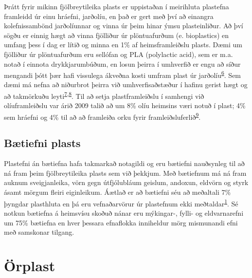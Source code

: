 \documentclass[icelandic,]{book}
\begin{document}
Þrátt fyrir mikinn fjölbreytileika plasts er uppistaðan í meirihluta plastefna framleidd úr einu hráefni, jarðolíu, en það er gert með því að einangra kolefnissambönd jarðolíunnar og vinna úr þeim hinar ýmsu plasteinliður. Að því sögðu er einnig hægt að vinna fjölliður úr plöntuafurðum (e. bioplastics) en umfang þess í dag er lítið og minna en 1\% af heimsframleiðslu plasts. Dæmi um fjölliður úr plöntuafurðum eru sellófan og PLA (polylactic acid), sem er m.a. notað í einnota drykkjarumbúðum, en losun þeirra í umhverfið er engu að síður mengandi þótt þær hafi vissulega ákveðna kosti umfram plast úr jarðolíu\textsuperscript{\protect\hyperlink{ref-karamanlioglu2017abiotic}{6}}. Sem dæmi má nefna að niðurbrot þeirra við umhverfisaðstæður í hafinu gerist hægt og að takmörkuðu leyti\textsuperscript{\protect\hyperlink{ref-tsuji2002environmental-1}{7},\protect\hyperlink{ref-tsuji2002environmental-2}{8}}. Til að setja plastframleiðslu í samhengi við olíuframleiðslu var árið 2009 talið að um 8\% olíu heimsins væri notuð í plast; 4\% sem hráefni og 4\% til að að framleiða orku fyrir framleiðsluferlið\textsuperscript{\protect\hyperlink{ref-hopewell2009plastics}{9}}.

\hypertarget{btiefni-plasts}{%
\section*{Bætiefni plasts}\label{btiefni-plasts}}

Plastefni án bætiefna hafa takmarkað notagildi og eru bætiefni nauðsynleg til að ná fram þeim fjölbreytileika plasts sem við þekkjum. Með bætiefnum má ná fram auknum sveigjanleika, vörn gegn útfjólubláum geislum, andoxun, eldvörn og styrk ásamt mörgum fleiri eiginleikum. Áætlað er að bætiefni séu að meðaltali 7\% þyngdar plasthluta en þá eru vefnaðarvörur úr plastefnum ekki meðtaldar\textsuperscript{\protect\hyperlink{ref-geyer2017production}{1}}. Sé notkun bætiefna á heimsvísu skoðuð nánar eru mýkingar-, fylli- og eldvarnarefni um 75\% bætiefna en hver þessara efnaflokka inniheldur mörg mismunandi efni með samskonar tilgang.

\hypertarget{orplast}{%
\chapter{Örplast}\label{orplast}}
\end{document}
